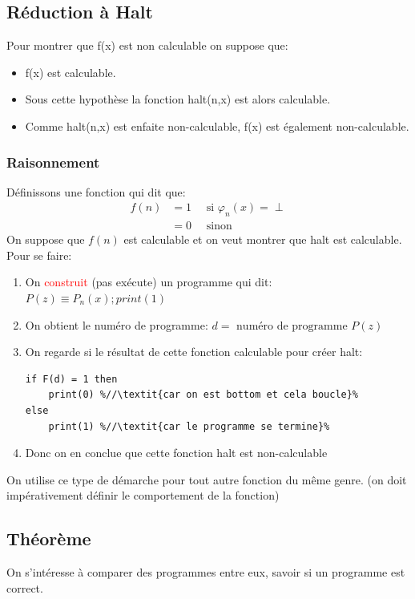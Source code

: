 \documentclass{report}
\begin{document}
\subsection{Réduction à Halt}
Pour montrer que f(x) est non calculable on suppose que:
\begin{itemize}
\item f(x) est calculable.
\item Sous cette hypothèse la fonction halt(n,x) est alors calculable.
\item Comme halt(n,x) est enfaite non-calculable, f(x) est également non-calculable.
\end{itemize}

\subsubsection{Raisonnement}
Définissons une fonction qui dit que:
\begin{align*}
f(n) &= 1 \quad \text{ si } \varphi_n(x) = \perp\\
&= 0 \quad \text{ sinon}
\end{align*}
On suppose que $f(n)$ est calculable et on veut montrer que halt est calculable. Pour se faire:
\begin{enumerate}
\item On \textcolor{red}{construit} (pas exécute) un programme qui dit: $P(z) \equiv P_n(x); print(1)$
\item On obtient le numéro de programme: $d = \text{ numéro de programme } P(z)$
\item On regarde si le résultat de cette fonction calculable pour créer halt:
\begin{lstlisting}[escapechar=\%]
if F(d) = 1 then
	print(0) %//\textit{car on est bottom et cela boucle}%
else
	print(1) %//\textit{car le programme se termine}%
\end{lstlisting}
\item Donc on en conclue que cette fonction halt est non-calculable
\end{enumerate}
On utilise ce type de démarche pour tout autre fonction du même genre. (on doit impérativement définir le comportement de la fonction)

\subsection{Théorème}
On s'intéresse à comparer des programmes entre eux, savoir si un programme est correct.
\end{document}
